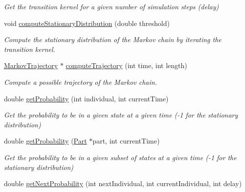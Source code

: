 \begin{DoxyCompactItemize}
\begin{DoxyCompactList}\small\item\em Get the transition kernel for a given number of simulation steps (delay) \end{DoxyCompactList}\item 
void \hyperlink{classMarkovProcess_a77be24a3ccec6e19ba922f932d19e0fa}{compute\-Stationary\-Distribution} (double threshold)
\begin{DoxyCompactList}\small\item\em Compute the stationary distribution of the Markov chain by iterating the transition kernel. \end{DoxyCompactList}\item 
\hyperlink{classMarkovTrajectory}{Markov\-Trajectory} $\ast$ \hyperlink{classMarkovProcess_aa0cb98a6e0fde978d037041e40ec78da}{compute\-Trajectory} (int time, int length)
\begin{DoxyCompactList}\small\item\em Compute a possible trajectory of the Markov chain. \end{DoxyCompactList}\item 
\hypertarget{classMarkovProcess_ad49d1ff46d5bf94e45a8b218b676c203}{double \hyperlink{classMarkovProcess_ad49d1ff46d5bf94e45a8b218b676c203}{get\-Probability} (int individual, int current\-Time)}\label{classMarkovProcess_ad49d1ff46d5bf94e45a8b218b676c203}

\begin{DoxyCompactList}\small\item\em Get the probability to be in a given state at a given time (-\/1 for the stationary distribution) \end{DoxyCompactList}\item 
\hypertarget{classMarkovProcess_afe80afb9c456631a9168c762058d3cd2}{double \hyperlink{classMarkovProcess_afe80afb9c456631a9168c762058d3cd2}{get\-Probability} (\hyperlink{classPart}{Part} $\ast$part, int current\-Time)}\label{classMarkovProcess_afe80afb9c456631a9168c762058d3cd2}

\begin{DoxyCompactList}\small\item\em Get the probability to be in a given subset of states at a given time (-\/1 for the stationary distribution) \end{DoxyCompactList}\item 
\hypertarget{classMarkovProcess_ab17f4ae9fa56c009553a5d50e899a84b}{double \hyperlink{classMarkovProcess_ab17f4ae9fa56c009553a5d50e899a84b}{get\-Next\-Probability} (int next\-Individual, int current\-Individual, int delay)}\label{classMarkovProcess_ab17f4ae9fa56c009553a5d50e899a84b}


\end{DoxyCompactItemize}
